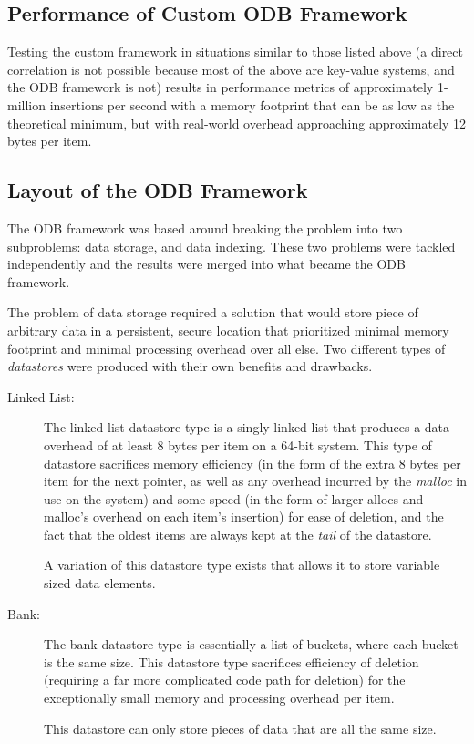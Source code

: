 \documentclass{article}
\theoremstyle{remark}
\theoremstyle{definition}
\theoremstyle{definition}
\theoremstyle{definition}
\begin{document}
\subsection{Performance of Custom ODB Framework}
Testing the custom framework in situations similar to those listed above (a direct correlation is not possible because most of the above are key-value systems, and the ODB framework is not) results in performance metrics of approximately 1-million insertions per second with a memory footprint that can be as low as the theoretical minimum, but with real-world overhead approaching approximately 12 bytes per item.

\subsection{Layout of the ODB Framework}
The ODB framework was based around breaking the problem into two subproblems: data storage, and data indexing. These two problems were tackled independently and the results were merged into what became the ODB framework.

The problem of data storage required a solution that would store piece of arbitrary data in a persistent, secure location that prioritized minimal memory footprint and minimal processing overhead over all else. Two different types of \emph{datastores} were produced with their own benefits and drawbacks.

\begin{description}
\item[Linked List: ] The linked list datastore type is a singly linked list that produces a data overhead of at least 8 bytes per item on a 64-bit system. This type of datastore sacrifices memory efficiency (in the form of the extra 8 bytes per item for the next pointer, as well as any overhead incurred by the \emph{malloc} in use on the system) and some speed (in the form of larger allocs and malloc's overhead on each item's insertion) for ease of deletion, and the fact that the oldest items are always kept at the \emph{tail} of the datastore.

A variation of this datastore type exists that allows it to store variable sized data elements.
\item[Bank: ] The bank datastore type is essentially a list of buckets, where each bucket is the same size. This datastore type sacrifices efficiency of deletion (requiring a far more complicated code path for deletion) for the exceptionally small memory and processing overhead per item.

This datastore can only store pieces of data that are all the same size.
\end{description}
\end{document}

